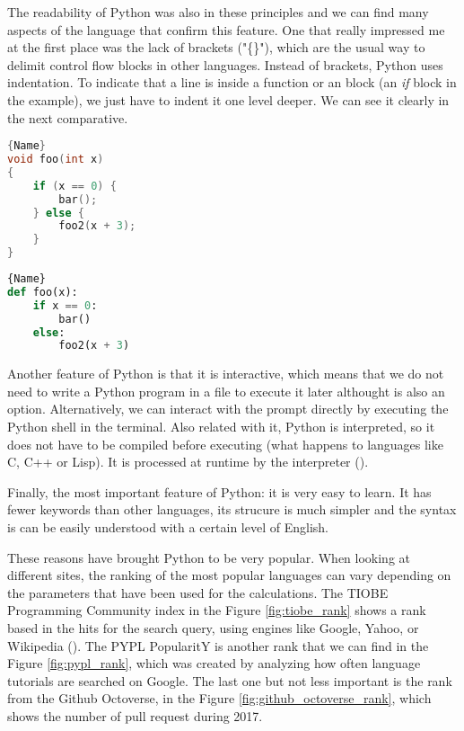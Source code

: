 The readability of Python was also in these principles and we can find many aspects of the language that confirm this feature. One that really impressed me at the first place was the lack of brackets ("\{\}"), which are the usual way to delimit control flow blocks in other languages. Instead of brackets, Python uses indentation. To indicate that a line is inside a function or an block (an \textit{if} block in the example), we just have to indent it one level deeper. We can see it clearly in the next comparative.

\noindent\begin{minipage}[t]{.45\textwidth}
\begin{lstlisting}[caption=C code,frame=tlrb, language=C]{Name}
void foo(int x)
{
    if (x == 0) {
        bar();
    } else {
        foo2(x + 3);
    }
}
\end{lstlisting}
\end{minipage}\hfill
\begin{minipage}[t]{.45\textwidth}
\begin{lstlisting}[caption=Python code,frame=tlrb, language=Python]{Name}
def foo(x):
    if x == 0:
        bar()
    else:
        foo2(x + 3)
\end{lstlisting}
\end{minipage}

Another feature of Python is that it is interactive, which means that we do not need to write a Python program in a file to execute it later althought is also an option. Alternatively, we can interact with the prompt directly by executing the Python shell in the terminal. Also related with it, Python is interpreted, so it does not have to be compiled before executing (what happens to languages like C, C++ or Lisp). It is processed at runtime by the interpreter (\cite{python_overview}). 

Finally, the most important feature of Python: it is very easy to learn. It has fewer keywords than other languages, its strucure is much simpler and the syntax is can be easily understood with a certain level of English. 

These reasons have brought Python to be very popular. When looking at different sites, the ranking of the most popular languages can vary depending on the parameters that have been used for the calculations. The TIOBE Programming Community index in the Figure \ref{fig:tiobe_rank} shows a rank based in the hits for the search query, using engines like Google, Yahoo, or Wikipedia (\cite{tiobe_index_def}). The PYPL PopularitY is another rank that we can find in the Figure \ref{fig:pypl_rank}, which was created by analyzing how often language tutorials are searched on Google. The last one but not less important is the rank from the Github Octoverse, in the Figure \ref{fig:github_octoverse_rank}, which shows the number of pull request during 2017.

